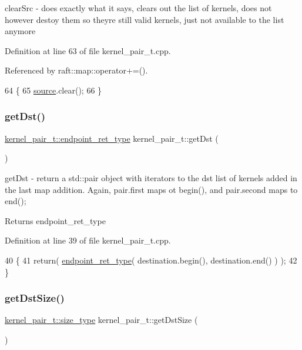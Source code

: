 clear\+Src -\/ does exactly what it says, clears out the list of kernels, does not however destoy them so they\textquotesingle{}re still valid kernels, just not available to the list anymore 

Definition at line 63 of file kernel\+\_\+pair\+\_\+t.\+cpp.



Referenced by raft\+::map\+::operator+=().


\begin{DoxyCode}
64 \{
65     \hyperlink{classsource}{source}.clear();
66 \}
\end{DoxyCode}
\hypertarget{classkernel__pair__t_af722fd511f929f0ed3aacd89f1bd9915}{}\label{classkernel__pair__t_af722fd511f929f0ed3aacd89f1bd9915} 
\subsubsection{\texorpdfstring{get\+Dst()}{getDst()}}
{\footnotesize\ttfamily \hyperlink{classkernel__pair__t_abc3c7ff96f4f00f4e31c56fb2b7da728}{kernel\+\_\+pair\+\_\+t\+::endpoint\+\_\+ret\+\_\+type} kernel\+\_\+pair\+\_\+t\+::get\+Dst (\begin{DoxyParamCaption}{ }\end{DoxyParamCaption})}

get\+Dst -\/ return a std\+::pair object with iterators to the dst list of kernels added in the last map addition. Again, pair.\+first maps ot begin(), and pair.\+second maps to end(); \begin{DoxyReturn}{Returns}
endpoint\+\_\+ret\+\_\+type 
\end{DoxyReturn}


Definition at line 39 of file kernel\+\_\+pair\+\_\+t.\+cpp.


\begin{DoxyCode}
40 \{
41     \textcolor{keywordflow}{return}( \hyperlink{classkernel__pair__t_abc3c7ff96f4f00f4e31c56fb2b7da728}{endpoint\_ret\_type}( destination.begin(), destination.end() ) );
42 \}
\end{DoxyCode}
\hypertarget{classkernel__pair__t_a4560aa51a147dd0cf2dcfab2b23d9cbe}{}\label{classkernel__pair__t_a4560aa51a147dd0cf2dcfab2b23d9cbe} 
\subsubsection{\texorpdfstring{get\+Dst\+Size()}{getDstSize()}}
{\footnotesize\ttfamily \hyperlink{classkernel__pair__t_aec4bb36f70893ab1bf0a912e8c3aca2a}{kernel\+\_\+pair\+\_\+t\+::size\+\_\+type} kernel\+\_\+pair\+\_\+t\+::get\+Dst\+Size (\begin{DoxyParamCaption}{ }\end{DoxyParamCaption})\hspace{0.3cm}{\ttfamily [noexcept]}}

